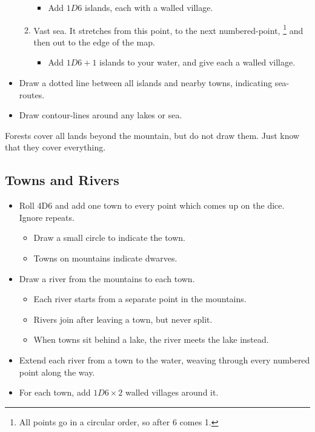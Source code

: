 \begin{multicols}{2}
\begin{itemize}
\begin{enumerate}
    \begin{itemize}
    \item
      Add $1D6$ islands, each with a walled village.
    \end{itemize}
  \item
    Vast sea. It stretches from this point, to the next numbered-point,%
    \footnote{All points go in a circular order, so after 6 comes 1.}
    and then out to the edge of the map.
    \begin{itemize}
    \item
      Add $1D6+1$ islands to your water, and give each a walled village.
    \end{itemize}
  \end{enumerate}
\item
  Draw a dotted line between all islands and nearby towns, indicating
  sea-routes.
\item
  Draw contour-lines around any lakes or sea.
\end{itemize}

Forests cover all lands beyond the mountain, but do not draw them. Just
know that they cover everything.

\subsection{Towns and Rivers}


\begin{itemize}
\item
  Roll 4D6 and add one town to every point which comes up on the dice.
  Ignore repeats.

  \begin{itemize}
  \item
    Draw a small circle to indicate the town.
  \item
    Towns on mountains indicate dwarves.
  \end{itemize}
\item
  Draw a river from the mountains to each town.

  \begin{itemize}
  \item
    Each river starts from a separate point in the mountains.
  \item
    Rivers join after leaving a town, but never split.
  \item
    When towns sit behind a lake, the river meets the lake instead.
  \end{itemize}
\item
  Extend each river from a town to the water, weaving through every
  numbered point along the way.
\item
  For each town, add $1D6 \times 2$ walled villages around it.


\end{itemize}
\end{multicols}

